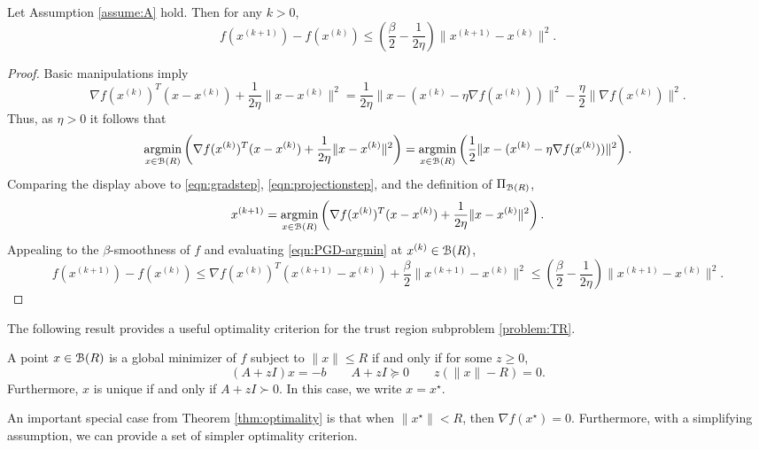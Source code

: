 \documentclass[11pt]{article}
\newcommand{\proj}{\ensuremath{\Pi_{\B(R)}}}
\begin{document}
\begin{lem}
\label{lem:descent-method}
Let Assumption \ref{assume:A} hold. 
Then for any $k > 0$, 
\[
f(x^{(k + 1)}) - 
f(x^{(k)}) \leq 
\left(\frac{\beta}{2} - \frac{1}{2\eta} \right) \|x^{(k + 1)} - x^{(k)}\|^2. 
\]
\end{lem}
\begin{proof}
    Basic manipulations imply
  \[
  \nabla f(x^{(k)})^T(x - x^{(k)}) + \frac{1}{2\eta} \|x - x^{(k)} \|^2 =
  \frac{1}{2\eta} \|x - (x^{(k)} - \eta \nabla f(x^{(k)}))\|^2 -\frac{\eta}{2}\|\nabla f(x^{(k)})\|^2. 
  \]
  Thus, as $\eta > 0$ it follows that
  \[
  \mathop{\rm argmin}_{x \in \mathcal{B}(R)}
  \left(\nabla f(x^{(k)})^T(x - x^{(k)}) + \frac{1}{2\eta} \|x - x^{(k)} \|^2\right) =
  \mathop{\rm argmin}_{x \in \mathcal{B}(R)}
  \left(
  \frac{1}{2} \|x - (x^{(k)} - \eta \nabla f(x^{(k)}))\|^2
  \right).
  \]
  Comparing the display above to \eqref{eqn:gradstep},
  \eqref{eqn:projectionstep}, and the definition of $\proj$,
  \begin{equation}\label{eqn:PGD-argmin}
  x^{(k + 1)} = \mathop{\rm argmin}_{x \in \mathcal{B}(R)}
  \left(
  \nabla f(x^{(k)})^T(x - x^{(k)}) + \frac{1}{2\eta} \|x - x^{(k)} \|^2
  \right).
  \end{equation}
  Appealing to the $\beta$-smoothness of $f$ and
  evaluating \eqref{eqn:PGD-argmin} at $x^{(k)} \in \mathcal{B}(R)$,
\[
f(x^{(k + 1)}) - f(x^{(k)}) 
\leq 
\nabla f(x^{(k)})^T(x^{(k + 1)} - x^{(k)}) 
+ \frac{\beta}{2} \|x^{(k + 1)} - x^{(k)}\|^2 
\leq 
\left(\frac{\beta}{2} - \frac{1}{2\eta}\right)  \|x^{(k + 1)} - x^{(k)}\|^2.
\]
\end{proof}
The following result provides 
a useful optimality criterion for 
the trust region subproblem 
\eqref{problem:TR}. 
\begin{thm}
\label{thm:optimality}
A point $x \in \mathcal{B}(R)$ is a global minimizer of $f$ subject to $\|x\| \leq R$ if and only if
for some $z \geq 0$, 
\[
(A + zI)x = -b 
\qquad
A  + z I \succeq 0
\qquad 
z(\|x\| - R) = 0.
\]
Furthermore, $x$ is unique if and only if $A + z I \succ 0$. In this case, we write $x = x^\star$. 
\end{thm}
An important special case from Theorem \ref{thm:optimality} is that when $\|x^\star\| < R$, then $\nabla f(x^\star) = 0$.
Furthermore, with a simplifying assumption, we can provide a set of simpler optimality criterion.
\end{document}
